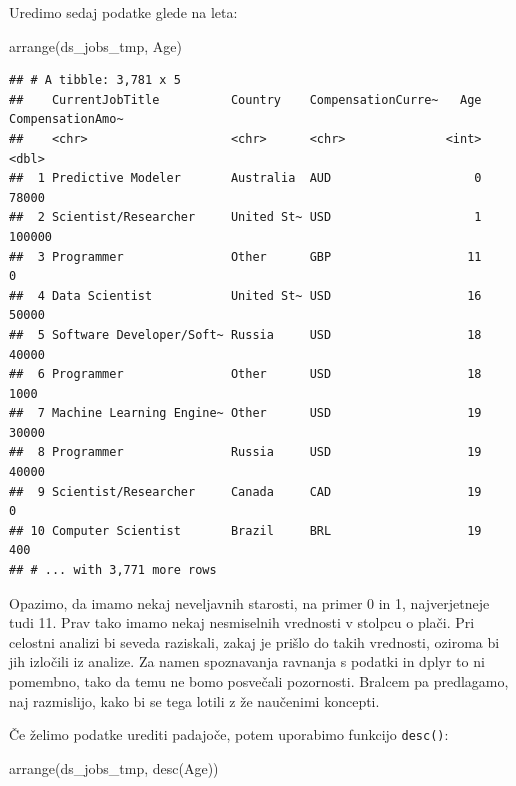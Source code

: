 \documentclass[
]{book}
\newenvironment{Shaded}{\begin{snugshade}}{\end{snugshade}}
\newcommand{\FunctionTok}[1]{\textcolor[rgb]{0.00,0.00,0.00}{#1}}
\newcommand{\NormalTok}[1]{#1}
\begin{document}
Uredimo sedaj podatke glede na leta:

\begin{Shaded}
\begin{Highlighting}[]
\FunctionTok{arrange}\NormalTok{(ds\_jobs\_tmp, Age)}
\end{Highlighting}
\end{Shaded}

\begin{verbatim}
## # A tibble: 3,781 x 5
##    CurrentJobTitle          Country    CompensationCurre~   Age CompensationAmo~
##    <chr>                    <chr>      <chr>              <int>            <dbl>
##  1 Predictive Modeler       Australia  AUD                    0            78000
##  2 Scientist/Researcher     United St~ USD                    1           100000
##  3 Programmer               Other      GBP                   11                0
##  4 Data Scientist           United St~ USD                   16            50000
##  5 Software Developer/Soft~ Russia     USD                   18            40000
##  6 Programmer               Other      USD                   18             1000
##  7 Machine Learning Engine~ Other      USD                   19            30000
##  8 Programmer               Russia     USD                   19            40000
##  9 Scientist/Researcher     Canada     CAD                   19                0
## 10 Computer Scientist       Brazil     BRL                   19              400
## # ... with 3,771 more rows
\end{verbatim}

Opazimo, da imamo nekaj neveljavnih starosti, na primer 0 in 1, najverjetneje tudi 11. Prav tako imamo nekaj nesmiselnih vrednosti v stolpcu o plači. Pri celostni analizi bi seveda raziskali, zakaj je prišlo do takih vrednosti, oziroma bi jih izločili iz analize. Za namen spoznavanja ravnanja s podatki in dplyr to ni pomembno, tako da temu ne bomo posvečali pozornosti. Bralcem pa predlagamo, naj razmislijo, kako bi se tega lotili z že naučenimi koncepti.

Če želimo podatke urediti padajoče, potem uporabimo funkcijo \texttt{desc()}:

\begin{Shaded}
\begin{Highlighting}[]
\FunctionTok{arrange}\NormalTok{(ds\_jobs\_tmp, }\FunctionTok{desc}\NormalTok{(Age))}
\end{Highlighting}
\end{Shaded}
\end{document}
